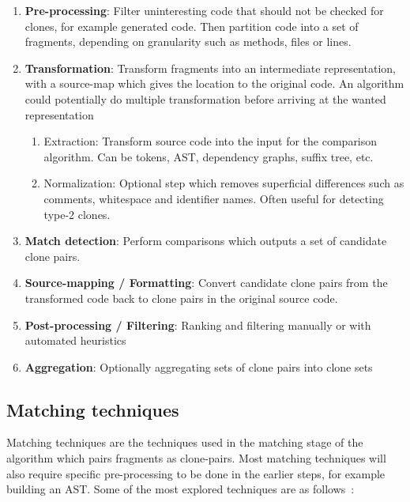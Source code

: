 \begin{enumerate}

    \item \textbf{Pre-processing}: Filter uninteresting code that should not be checked
        for clones, for example generated code. Then partition code into a set of
        fragments, depending on granularity such as methods, files or lines.

	\item \textbf{Transformation}: Transform fragments into an intermediate
	      representation, with a source-map which gives the location to the original code.
          An algorithm could potentially do multiple transformation before arriving at the wanted
          representation
	      \begin{enumerate}
		      \item Extraction: Transform source code into the input for the comparison
		            algorithm. Can be tokens, AST, dependency graphs, suffix tree, etc.
		      \item Normalization: Optional step which removes superficial differences such as
		            comments, whitespace and identifier names. Often useful for detecting type-2
		            clones.
	      \end{enumerate}
	\item \textbf{Match detection}: Perform comparisons which outputs a set of
	      candidate clone pairs.
	\item \textbf{Source-mapping / Formatting}: Convert candidate clone pairs from the transformed
	      code back to clone pairs in the original source code.
	\item \textbf{Post-processing / Filtering}: Ranking and filtering manually or with
	      automated heuristics
	\item \textbf{Aggregation}: Optionally aggregating sets of clone pairs into clone sets
\end{enumerate}

\subsection*{Matching techniques}

Matching techniques are the techniques used in the matching stage of the algorithm which
pairs fragments as clone-pairs. Most matching techniques will also require specific
pre-processing to be done in the earlier steps, for example building an AST. Some of the
most explored techniques are as follows~\cite{ComparisonAndEvaluationOfTechniques}:

